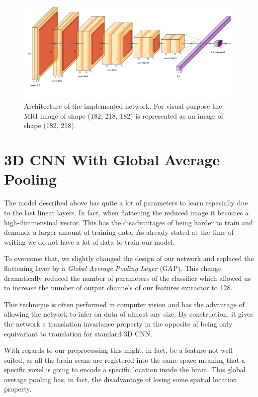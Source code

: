 \begin{figure}
    \centering
    \includegraphics[width=1\linewidth]{figures/models/standard_cnn_model.pdf}
    \caption{Architecture of the implemented network. For visual purpose the MRI image of shape (182, 218, 182) is represented as an image of shape (182, 218).}
    \label{fig:standard_cnn_model}
\end{figure}

\section{3D CNN With Global Average Pooling}

The model described above has quite a lot of parameters to learn especially due to the last linear layers. In fact, when flattening the reduced image it becomes a high-dimmensinal vector. This has the disadvantages of being harder to train and demands a larger amount of training data. As already stated at the time of writing we do not have a lot of data to train our model. 

To overcome that, we slightly changed the design of our network and replaced the flattening layer by a \textit{Global Average Pooling Layer}\cite{GAP_lin2013network} (GAP). This change dramatically reduced the number of parameters of the classifier which allowed us to increase the number of output channels of our features extractor to 128.  

This technique is often performed in computer vision and has the advantage of allowing the network to infer on data of almost any size. By construction, it gives the network a translation invariance property in the opposite of being only equivariant to translation for standard 3D CNN.

With regards to our preprocessing this might, in fact, be a feature not well suited, as all the brain scans are registered into the same space meaning that a specific voxel is going to encode a specific location inside the brain. This global average pooling has, in fact, the disadvantage of losing some spatial location property.


